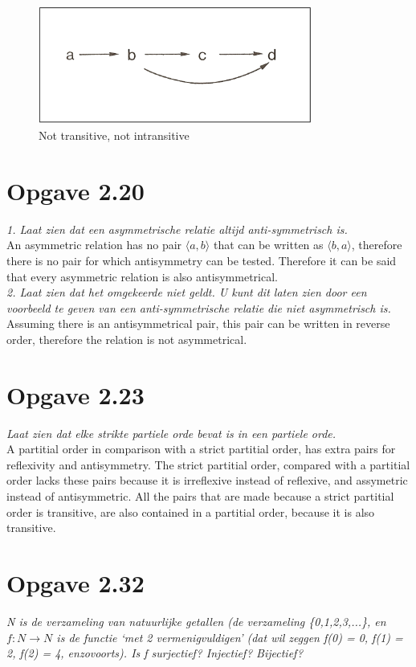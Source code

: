 \documentclass[11pt]{article}
\begin{document}
\begin{figure}[ht!]
\centering
\includegraphics[width=90mm]{image1.png}
\caption{Not transitive, not intransitive \label{overflow}}
\end{figure}

\section*{Opgave 2.20}
\textit{1. Laat zien dat een asymmetrische relatie altijd anti-symmetrisch is.}
\\

An asymmetric relation has no pair $ \langle a, b \rangle $ that can be written as $ \langle b, a \rangle $, therefore there is no pair for which antisymmetry can be tested. Therefore it can be said that every asymmetric relation is also antisymmetrical.
\\

\textit{2. Laat zien dat het omgekeerde niet geldt. U kunt dit laten zien door een voorbeeld te geven van een anti-symmetrische relatie die niet asymmetrisch is.}
\\

Assuming there is an antisymmetrical pair, this pair can be written in reverse order, therefore the relation is not asymmetrical.


\section*{Opgave 2.23}
\textit{Laat zien dat elke strikte partiele orde bevat is in een partiele orde.}
\\

A partitial order in comparison with a strict partitial order, has extra pairs for reflexivity and antisymmetry. The strict partitial order, compared with a partitial order lacks these pairs because it is irreflexive instead of reflexive, and assymetric instead of antisymmetric. All the pairs that are made because a strict partitial order is transitive, are also contained in a partitial order, because it is also transitive.


\section*{Opgave 2.32}
\textit{N is de verzameling van natuurlijke getallen (de verzameling \{0,1,2,3,...\}, en $ f : N \rightarrow N $ is de functie ‘met 2 vermenigvuldigen’ (dat wil zeggen f(0) = 0, f(1) = 2, f(2) = 4, enzovoorts). Is f surjectief? Injectief? Bijectief?} \\
\end{document}
